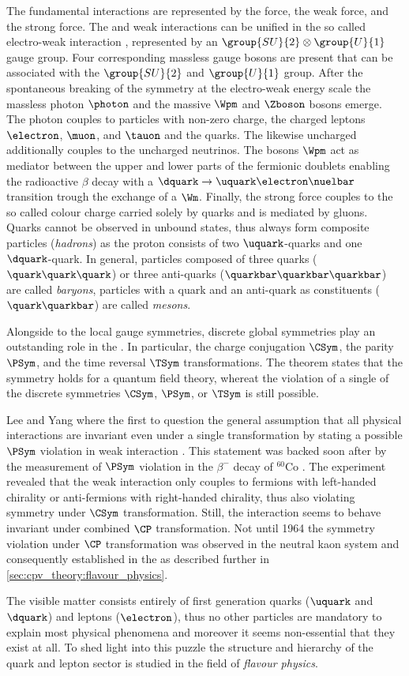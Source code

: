 The fundamental interactions are represented by the \EM force, the weak force,
and the strong force. The \EM and weak interactions can be unified in the so
called electro-weak interaction \cite{set:gws}, represented by an
$\group{SU}{2}\otimes\group{U}{1}$ gauge group. Four corresponding massless
gauge bosons are present that can be associated with the $\group{SU}{2}$ and
$\group{U}{1}$ group. After the spontaneous breaking of the symmetry at the
electro-weak energy scale the massless photon $\photon$ and the massive $\Wpm$
and $\Zboson$ bosons emerge. The photon couples to particles with non-zero \EM
charge, \ie the charged leptons $\electron$, $\muon$, and $\tauon$ and the
quarks. The likewise uncharged \Zboson additionally couples to the uncharged
neutrinos. The bosons $\Wpm$ act as mediator between the upper and lower parts
of the fermionic doublets enabling \eg the radioactive $\beta$ decay with a
$\dquark\to\uquark\electron\nuelbar$ transition trough the exchange of a $\Wm$.
Finally, the strong force couples to the so called colour charge carried solely
by quarks and is mediated by gluons. Quarks cannot be observed in unbound
states, thus always form composite particles (\emph{hadrons}) as \eg the proton
consists of two $\uquark$-quarks and one $\dquark$-quark. In general, particles
composed of three quarks ($\quark\quark\quark$) or three anti-quarks
($\quarkbar\quarkbar\quarkbar$) are called \emph{baryons}, particles with a
quark and an anti-quark as constituents ($\quark\quarkbar$) are called
\emph{mesons}.

Alongside to the local gauge symmetries, discrete global symmetries play an
outstanding role in the \SM. In particular, the charge conjugation $\CSym$, the
parity $\PSym$, and the time reversal $\TSym$ transformations. The \CPT theorem
\cite{set:cpt} states that the \CPT symmetry holds for a quantum field theory,
whereat the violation of a single of the discrete symmetries $\CSym$, $\PSym$,
or $\TSym$ is still possible. 

Lee and Yang where the first to question the general assumption that all
physical interactions are invariant even under a single transformation by
stating a possible $\PSym$ violation in weak interaction \cite{Lee:1956qn}. This
statement was backed soon after by the measurement of $\PSym$ violation in the
$\beta^{-}$ decay of ${}^{60}\text{Co}$ \cite{Wu:1957my}. The experiment
revealed that the weak interaction only couples to fermions with left-handed
chirality or anti-fermions with right-handed chirality, thus also violating
symmetry under $\CSym$ transformation. Still, the interaction seems to behave
invariant under combined $\CP$ transformation. Not until 1964 the symmetry
violation under $\CP$ transformation was observed in the neutral kaon system
\cite{Christenson:1964fg} and consequently established in the \SM as described
further in \cref{sec:cpv_theory:flavour_physics}.

The visible matter consists entirely of first generation quarks ($\uquark$ and
$\dquark$) and leptons ($\electron$), thus no other particles are mandatory to
explain most physical phenomena and moreover it seems non-essential that they
exist at all. To shed light into this puzzle the structure and hierarchy of the
quark and lepton sector is studied in the field of \emph{flavour physics}.
